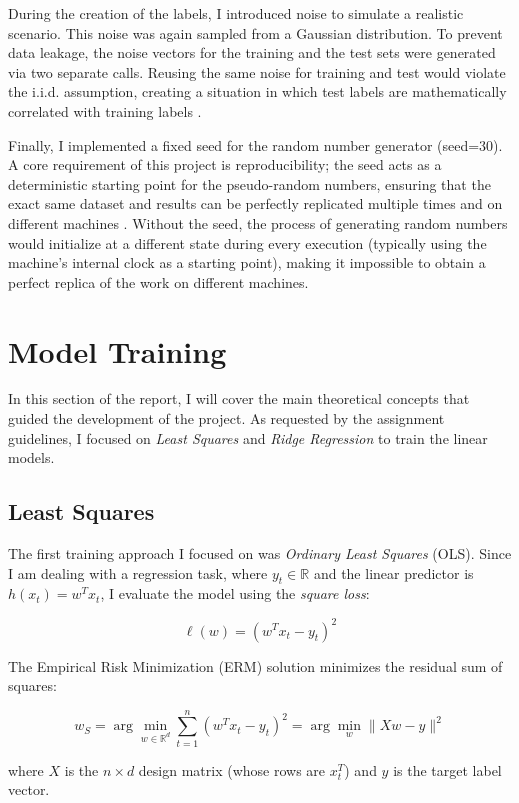\documentclass[11pt,a4paper]{article}
\begin{document}
During the creation of the labels, I introduced noise to simulate a realistic scenario. This noise was again sampled from a Gaussian distribution. To prevent data leakage, the noise vectors for the training and the test sets were generated via two separate calls. Reusing the same noise for training and test would violate the i.i.d. assumption, creating a situation in which test labels are mathematically correlated with training labels \cite{data-leakage}.

Finally, I implemented a fixed seed for the random number generator (seed=30). A core requirement of this project is reproducibility; the seed acts as a deterministic starting point for the pseudo-random numbers, ensuring that the exact same dataset and results can be perfectly replicated multiple times and on different machines \cite{JMLR:v22:20-303}. Without the seed, the process of generating random numbers would initialize at a different state during every execution (typically using the machine's internal clock as a starting point), making it impossible to obtain a perfect replica of the work on different machines.

\section{Model Training}

In this section of the report, I will cover the main theoretical concepts that guided the development of the project. As requested by the assignment guidelines, I focused on \textit{Least Squares} and \textit{Ridge Regression} to train the linear models.

\subsection{Least Squares}

The first training approach I focused on was \textit{Ordinary Least Squares} (OLS). Since I am dealing with a regression task, where $y_t \in \mathbb{R}$ and the linear predictor is $h(x_t) = w^T x_t$, I evaluate the model using the \textit{square loss}:

\[
\ell(w) = (w^T x_t - y_t)^2
\]

The Empirical Risk Minimization (ERM) solution minimizes the residual sum of squares:

\[
w_S = \arg\min_{w \in \mathbb{R}^d} \sum_{t=1}^n (w^T x_t - y_t)^2 = \arg\min_w \|X w - y\|^2
\]

where $X$ is the $n \times d$ design matrix (whose rows are $x_t^T$) and $y$ is the target label vector.
\end{document}
